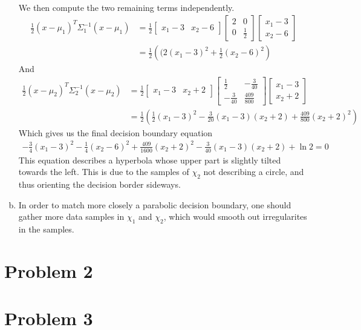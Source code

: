 \documentclass[a4paper, 10pt, twoside]{article}
\begin{document}
\begin{enumerate}[a)]
\begin{align*}
          \end{align*}
          We then compute the two remaining terms independently.
          \begin{align*}
              \frac{1}{2} (x - \mu_1)^T \Sigma_1^{-1}(x - \mu_1)
               & =
              \frac{1}{2}
              \begin{bmatrix}x_1-3 & x_2-6\end{bmatrix}
              \begin{bmatrix}2 & 0 \\ 0 & \frac{1}{2}\end{bmatrix}
              \begin{bmatrix}x_1-3 \\ x_2-6\end{bmatrix} \\
               & =
              \frac{1}{2}\left((2(x_1-3)^2 + \frac{1}{2}(x_2-6)^2\right)
          \end{align*}
          And
          \begin{align*}
              \frac{1}{2} (x - \mu_2)^T \Sigma_2^{-1}(x - \mu_2)
               & =
              \frac{1}{2}
              \begin{bmatrix}x_1-3 & x_2+2\end{bmatrix}
              \begin{bmatrix}\frac{1}{2} & -\frac{3}{40} \\ -\frac{3}{40} & \frac{409}{800}\end{bmatrix}
              \begin{bmatrix}x_1-3 \\ x_2+2\end{bmatrix} \\
               & =
              \frac{1}{2}\left(\frac{1}{2}(x_1-3)^2 - \frac{3}{20}(x_1-3)(x_2+2)+\frac{409}{800}(x_2+2)^2\right)
          \end{align*}
          Which gives us the final decision boundary equation
          \begin{align*}
              -\frac{3}{4} (x_1-3)^2 - \frac{1}{4} (x_2-6)^2 + \frac{409}{1600} (x_2+2)^2 - \frac{3}{40} (x_1-3)(x_2+2) + \ln 2 = 0
          \end{align*}
          This equation describes a hyperbola whose upper part is slightly tilted towards the left. This is due to the samples of $\chi_2$ not describing a circle, and thus orienting the decision border sideways.
    \item In order to match more closely a parabolic decision boundary, one should gather more data samples in $\chi_1$ and $\chi_2$, which would smooth out irregularites in the samples.
\end{enumerate}

\section*{Problem 2}

\section*{Problem 3}
\end{document}
